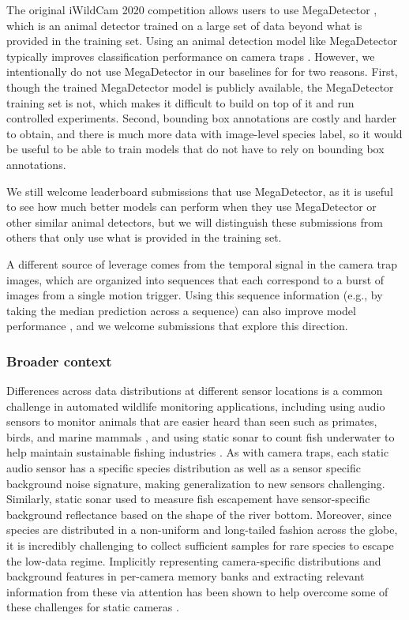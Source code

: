 The original iWildCam 2020 competition allows users to use MegaDetector \citep{beery2019efficient}, which is an animal detector trained on a large set of data beyond what is provided in the training set.
Using an animal detection model like MegaDetector typically improves classification performance on camera traps \citep{beery2018recognition}.
However, we intentionally do not use MegaDetector in our baselines for \iWildCam for two reasons.
First, though the trained MegaDetector model is publicly available, the MegaDetector training set is not, which makes it difficult to build on top of it and run controlled experiments.
Second, bounding box annotations are costly and harder to obtain, and there is much more data with image-level species label, so it would be useful to be able to train models that do not have to rely on bounding box annotations.

We still welcome leaderboard submissions that use MegaDetector, as it is useful to see how much better models can perform when they use MegaDetector or other similar animal detectors, but we will distinguish these submissions from others that only use what is provided in the training set.

A different source of leverage comes from the temporal signal in the camera trap images, which are organized into sequences that each correspond to a burst of images from a single motion trigger.
Using this sequence information (e.g., by taking the median prediction across a sequence) can also improve model performance \citep{beery2018recognition},
and we welcome submissions that explore this direction.

\subsubsection{Broader context}
Differences across data distributions at different sensor locations is a common challenge in automated wildlife monitoring applications, including using audio sensors to monitor animals that are easier heard than seen such as primates, birds, and marine mammals \citep{crunchant2020listening, stowell2019automatic, shiu2020deep}, and using static sonar to count fish underwater to help maintain sustainable fishing industries \citep{pipal2012estimating, vatnehol2018method, schneider2020counting}.
As with camera traps, each static audio sensor has a specific species distribution as well as a sensor specific background noise signature, making generalization to new sensors challenging. Similarly, static sonar used to measure fish escapement have sensor-specific background reflectance based on the shape of the river bottom.
Moreover, since species are distributed in a non-uniform and long-tailed fashion across the globe, it is incredibly challenging to collect sufficient samples for rare species to escape the low-data regime.
Implicitly representing camera-specific distributions and background features in per-camera memory banks and extracting relevant information from these via attention has been shown to help overcome some of these challenges for static cameras \citep{beery2020context}.

